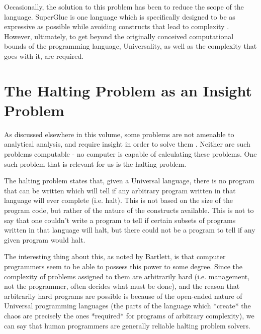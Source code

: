 Occasionally, the solution to this problem has been to reduce the scope of the language.  SuperGlue is one language which is specifically designed to be as expressive as possible while avoiding constructs that lead to complexity \cite{mcdirmid}.  However, ultimately, to get beyond the originally conceived computational bounds of the programming language, Universality, as well as the complexity that goes with it, are required.

\section{The Halting Problem as an Insight Problem}

As discussed elsewhere in this volume, some problems are not amenable to analytical analysis, and require insight in order to solve them \cite{bartlett1, holloway}.  Neither are such problems computable - no computer is capable of calculating these problems.  One such problem that is relevant for us is the halting problem.

The halting problem states that, given a Universal language, there is no program that can be written which will tell if any arbitrary program written in that language will ever complete (i.e. halt).  This is not based on the size of the program code, but rather of the nature of the constructs available.  This is not to say that one couldn't write a program to tell if certain subsets of programs written in that language will halt, but there could not be a program to tell if any given program would halt.

The interesting thing about this, as noted by Bartlett\cite{bartlett1}, is that computer programmers seem to be able to possess this power to some degree.  Since the complexity of problems assigned to them are arbitrarily hard (i.e. management, not the programmer, often decides what must be done), and the reason that arbitrarily hard programs are possible is because of the open-ended nature of Universal programming languages (the parts of the language which *create* the chaos are precisely the ones *required* for programs of arbitrary complexity), we can say that human programmers are generally reliable halting problem solvers.

